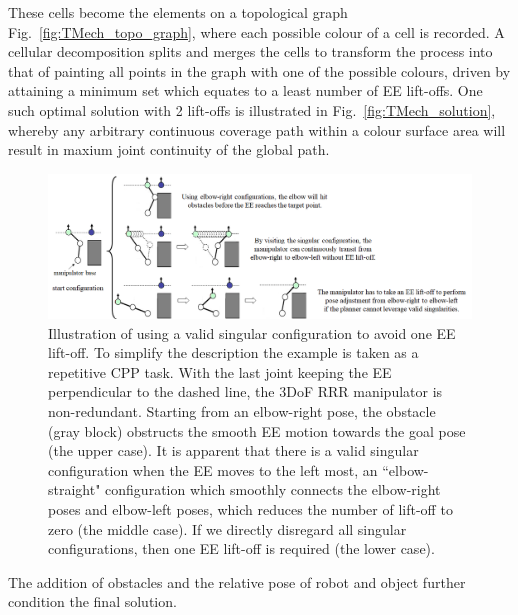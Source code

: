\documentclass[Afour,sageh,times]{sagej}
\begin{document}
These cells become the elements on a topological graph Fig.~\ref{fig:TMech_topo_graph}, where each possible colour of a cell is recorded. 
A cellular decomposition splits and merges the cells to transform the process into that of painting all points in the graph with one of the possible colours, driven by attaining a minimum set which equates to a least number of EE lift-offs. 
One such optimal solution with 2 lift-offs is illustrated in Fig.~\ref{fig:TMech_solution}, 
whereby any arbitrary continuous coverage path within a colour surface area will result in maxium joint continuity of the global path. 
\begin{figure}[t]
\centering
\includegraphics[width = \textwidth]{figures/other_figures/2dof_demo_2}
\caption{
Illustration of using a valid singular configuration to avoid one EE lift-off. To simplify the description the example is taken as a repetitive CPP task. With the last joint keeping the EE perpendicular to the dashed line, the 3DoF RRR manipulator is non-redundant. Starting from an elbow-right pose, the obstacle (gray block) obstructs the smooth EE motion towards the goal pose (the upper case). 
It is apparent that there is a valid singular configuration when the EE moves to the left most, an ``elbow-straight" configuration which smoothly connects the elbow-right poses and elbow-left poses, which reduces the number of lift-off to zero (the middle case). 
If we directly disregard all singular configurations, then one EE lift-off is required (the lower case). 
}\label{fig_2dof_demo}
\end{figure}
The addition of obstacles and the relative pose of robot and object further condition the final solution. 
\end{document}
